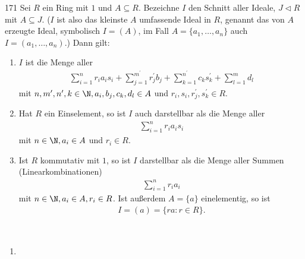 \begin{algebraUE}{171}
Sei $R$ ein Ring mit $1$ und $A \subseteq R$. Bezeichne $I$ den Schnitt aller Ideale,
$J \vartriangleleft R$ mit $A \subseteq J$. ($I$ ist also das kleinste $A$ umfassende
Ideal in $R$, genannt das von $A$ erzeugte Ideal, symbolisch $I = (A)$, im Fall
$A = \{a_1,\dots,a_n\}$ auch $I = (a_1,\dots,a_n)$.) Dann gilt:
\begin{enumerate}[label = (\arabic*)]
  \item $I$ ist die Menge aller
  \begin{align*}
    \sum_{i = 1}^n r_ia_is_i + \sum_{j = 1}^{m^{\prime}}r_j^{\prime}b_j +
    \sum_{k = 1}^{n^{\prime}}c_ks_k^{\prime} + \sum_{l = 1}^{m}d_l
  \end{align*}
  mit $n,m^{\prime}, n^{\prime}, k \in \N, a_i, b_j, c_k, d_l \in A$ und
  $r_i, s_i, r_j^{\prime}, s_k^{\prime} \in R$.
  \item Hat $R$ ein Einselement, so ist $I$ auch darstellbar als die Menge aller
  \begin{align*}
    \sum_{i = 1}^n r_ia_is_i
  \end{align*}
  mit $n \in \N, a_i \in A$ und $r_i \in R$.
  \item Ist $R$ kommutativ mit $1$, so ist $I$ darstellbar als die Menge aller
  Summen (Linearkombinationen)
  \begin{align*}
    \sum_{i=1}^n r_ia_i
  \end{align*}
  mit $n \in \N, a_i \in A, r_i \in R$. Ist außerdem $A = \{a\}$ einelementig, so ist
  \begin{align*}
    I = (a) = \{ra: r \in R\}.
  \end{align*}
\end{enumerate}
\end{algebraUE}
\begin{solution}
\leavevmode \\
\begin{enumerate}[label = (\arabic*)]
  \item
\end{enumerate}
\end{solution}
